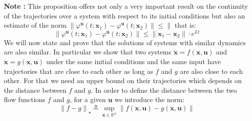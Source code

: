 \documentclass[a4paper,10pt,oneside]{book}
\begin{document}
\noindent \textbf{Note :} This proposition offers not only a very important result on the continuity of the trajectories over a system with respect to its initial conditions but also an estimate of the norm $\|\varphi^{\mathbf{u}}(t;\mathbf{x}_1)-\varphi^{\mathbf{u}}(t;\mathbf{x}_2) \| \leq \|$ that is:
\begin{equation}
 \|\varphi^{\mathbf{u}}(t;\mathbf{x}_1)-\varphi^{\mathbf{u}}(t;\mathbf{x}_2) \| \leq \|\mathbf{x}_1-\mathbf{x}_2 \|\cdot e^{Lt}
\end{equation}
We will now state and prove that the solutions of systems with similar dynamics are also similar. In particular we show that two systems $\dot{\mathbf{x}}=f(\mathbf{x},\mathbf{u})$ and $\dot{\mathbf{x}}=g(\mathbf{x},\mathbf{u})$ under the same initial conditions and the same input have trajectories that are close to each other as long as $f$ and $g$ are also close to each other. For that we need an upper bound on their trajectories which depends on the distance between $f$ and $g$. In order to define the distance between the two flow functions $f$ and $g$, for a given $\mathbf{u}$ we introduce the norm:
\begin{equation}
 \left\|f-g\right\|_{\star} \triangleq\sup_{\mathbf{x}\in\mathbb{R}^n} \|f(\mathbf{x},\mathbf{u})-g(\mathbf{x},\mathbf{u})\|
\end{equation}
\end{document}
